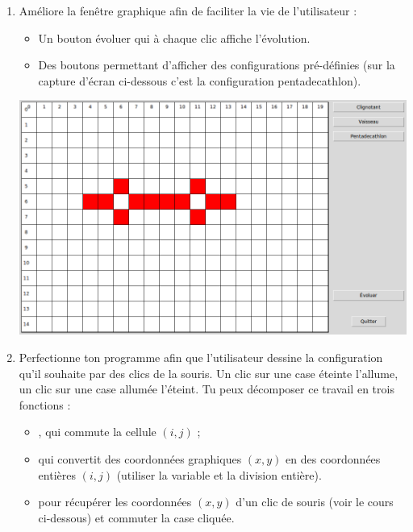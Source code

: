 \documentclass[11pt,class=report,crop=false]{standalone}
\begin{document}
 


\begin{activite}[Itérations]


\begin{enumerate}
  \item  Améliore la fenêtre graphique afin de faciliter la vie de l'utilisateur :
  \begin{itemize}
    \item Un bouton \og{}évoluer\fg{} qui à chaque clic affiche l'évolution.
    \item Des boutons permettant d'afficher des configurations pré-définies (sur la capture d'écran ci-dessous c'est la configuration \og{}pentadecathlon\fg{}).
  \end{itemize}
  
\begin{center}
\includegraphics[scale=0.3]{ecran-vie-4a}
\end{center}  
  
  \item Perfectionne ton programme afin que l'utilisateur dessine la configuration qu'il souhaite par des clics de la souris. Un clic sur une case éteinte l'allume, un clic sur une case allumée l'éteint. 
  Tu peux décomposer ce travail en trois fonctions :
  \begin{itemize}
    \item {}, qui commute la cellule $(i,j)$ ;
    \item {} qui convertit des coordonnées graphiques $(x,y)$ en des coordonnées entières $(i,j)$ (utiliser la variable  et la division entière).
    \item {} pour récupérer les coordonnées $(x,y)$ d'un clic de souris (voir le cours ci-dessous) et commuter la case cliquée.
  \end{itemize}   
    

\end{enumerate}
\end{activite}
\end{document}
